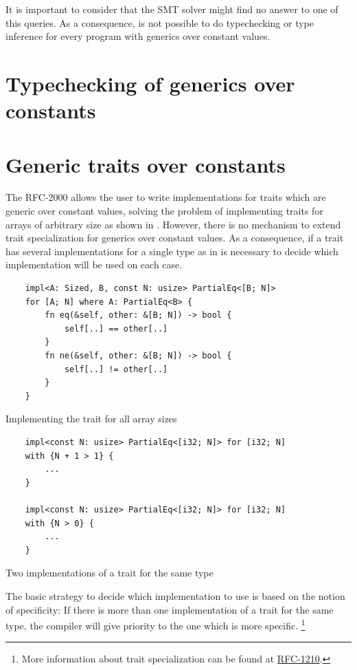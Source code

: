 It is important to consider that the SMT solver might find no answer to one of
this queries. As a consequence, is not possible to do typechecking or type
inference for every program with generics over constant values.

\section{Typechecking of generics over constants}

\section{Generic traits over constants}

The RFC-2000 allows the user to write implementations for traits which are
generic over constant values, solving the problem of implementing traits for
arrays of arbitrary size as shown in . However,
there is no mechanism to extend trait specialization for generics over constant
values. As a consequence, if a trait has several implementations for a single
type as in  is necessary to decide which
implementation will be used on each case. 

\begin{listing}[ht]
	\begin{verbatim}
    impl<A: Sized, B, const N: usize> PartialEq<[B; N]> 
    for [A; N] where A: PartialEq<B> {
        fn eq(&self, other: &[B; N]) -> bool {
            self[..] == other[..]
        }
        fn ne(&self, other: &[B; N]) -> bool {
            self[..] != other[..]
        }
    }
	\end{verbatim}
    \caption{Implementing the  trait for all array sizes}
  \label{lst:trait_const_generics}
\end{listing}

\begin{listing}[ht]
	\begin{verbatim}
    impl<const N: usize> PartialEq<[i32; N]> for [i32; N]
    with {N + 1 > 1} {
        ...
    }
   
    impl<const N: usize> PartialEq<[i32; N]> for [i32; N]
    with {N > 0} {
        ...
    }
	\end{verbatim}
    \caption{Two implementations of a trait for the same type}
  \label{lst:trait_const_generics_spec}
\end{listing}

The basic strategy to decide which implementation to use is based on the notion
of specificity: If there is more than one implementation of a trait for the
same type, the compiler will give priority to the one which is more specific.
\footnote{More information about trait specialization can be found at
\href{https://github.com/rust-lang/rfcs/blob/master/text/1210-impl-specialization.md}{RFC-1210}.}

